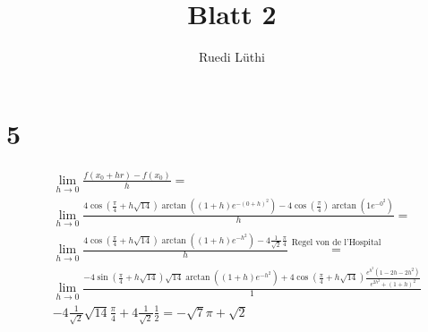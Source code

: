 \documentclass[11pt,a4paper]{article}
\author{Ruedi Lüthi}
\title{Blatt 2}
\newcommand{\1}    	{\mathbbm{1}}
\begin{document}
	\maketitle
	
	\section*{5}
	\begin{align*}
		&\lim_{h \rightarrow 0} \frac{f(x_0 + h r) - f(x_0)}{h} =\\
		&\lim_{h \rightarrow 0} \frac{4 \cos\left( \frac{\pi}{4} + h \sqrt{14} \right) \arctan \left( (1+h) e^{-(0+h)^2} \right) - 4 \cos\left( \frac{\pi}{4} \right) \arctan \left( 1 e^{-0^2} \right) }{h} = \\
		&\lim_{h \rightarrow 0}
		\frac{4 \cos\left( \frac{\pi}{4} + h \sqrt{14} \right)
		\arctan \left( (1+h) e^{-h^2}\right) - 4 \frac{1}{\sqrt{2}} \frac{\pi}{4} }{h} \stackrel{\textrm{Regel von de l'Hospital}}{=} \\
		&\lim_{h \rightarrow 0}
		\frac{
			-4\sin\left( \frac{\pi}{4} + h \sqrt{14} \right) \sqrt{14}  \arctan\left( (1+h)e^{-h^2} \right)
			+4\cos\left( \frac{\pi}{4} + h \sqrt{14} \right) \frac{e^{h^2}(1-2h-2h^2)}{e^{2h^2}+(1+h)^2}
		}{1} \\
		&-4 \frac{1}{\sqrt{2}}\sqrt{14}\frac{\pi}{4}
		+ 4 \frac{1}{\sqrt{2}}\frac{1}{2} = -\sqrt{7}\pi + \sqrt{2}
	\end{align*}
	
\end{document}
